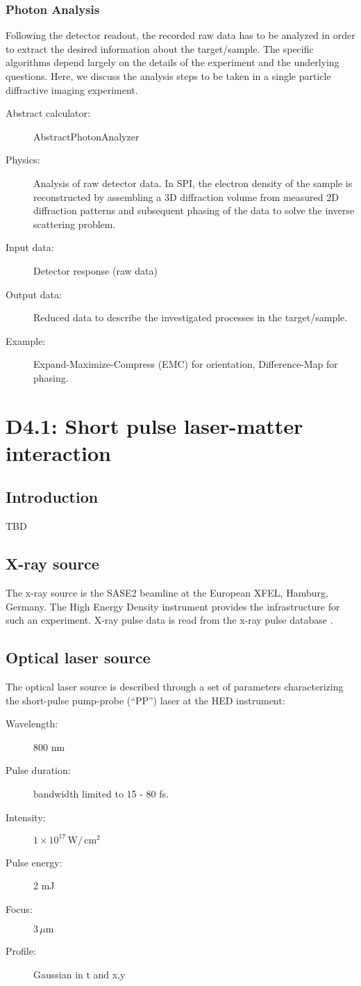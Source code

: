 \documentclass[a4paper]{article}
\begin{document}
\subsubsection{Photon Analysis}
Following the detector readout, the recorded raw data has to be analyzed in order to extract the desired information about the target/sample. The
specific algorithms depend largely on the details of the experiment and the underlying questions. Here, we discuss the analysis steps to be taken
in a single particle diffractive imaging experiment.
\begin{description}
  \item[Abstract calculator:] AbstractPhotonAnalyzer
  \item[Physics:]  Analysis of raw detector data. In SPI, the electron density of the sample is reconstructed by assembling a 3D diffraction volume
    from measured 2D diffraction patterns and subsequent phasing of the data to solve the inverse scattering problem.
  \item[Input data:] Detector response (raw data)
  \item[Output data:] Reduced data to describe the investigated processes in the target/sample.
  \item[Example:]  Expand-Maximize-Compress (EMC) for orientation, Difference-Map for phasing.
\end{description}



\section{D4.1: Short pulse laser-matter interaction\label{sec:short_pulse}}



\subsection{Introduction}
TBD
\subsection{X-ray source}
The x-ray source is the SASE2 beamline at the European XFEL, Hamburg, Germany. The High Energy Density instrument \cite{} provides the infrastructure
for such an experiment. X-ray pulse data is read from the x-ray pulse database \cite{}.
\subsection{Optical laser source}
The optical laser source is described through a set of parameters characterizing the short-pulse pump-probe (``PP'') laser at the HED
instrument:
\begin{description}
  \item[Wavelength:] 800 nm
  \item[Pulse duration:] bandwidth limited to 15 - 80 fs.
  \item[Intensity:] $1\times 10^{17}\,\text{W}/\,\text{cm}^2$
  \item[Pulse energy:] 2 mJ
  \item[Focus:] $3\,\mu\text{m}$
  \item[Profile:] Gaussian in t and x,y
\end{description}
\end{document}
